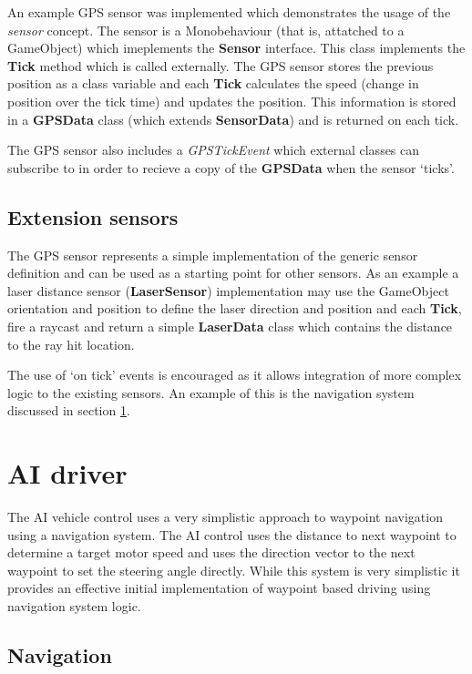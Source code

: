 \documentclass{article}
\begin{document}
An example GPS sensor was implemented which demonstrates the usage of the \textit{sensor} concept. The sensor is a Monobehaviour (that is, attatched to a GameObject) which imeplements the \textbf{Sensor} interface. This class implements the \textbf{Tick} method which is called externally. The GPS sensor stores the previous position as a class variable and each \textbf{Tick} calculates the speed (change in position over the tick time) and updates the position. This information is stored in a \textbf{GPSData} class (which extends \textbf{SensorData}) and is returned on each tick.

The GPS sensor also includes a \textit{GPSTickEvent} which external classes can subscribe to in order to recieve a copy of the \textbf{GPSData} when the sensor `ticks'.

\subsection{Extension sensors}

The GPS sensor represents a simple implementation of the generic sensor definition and can be used as a starting point for other sensors. As an example a laser distance sensor (\textbf{LaserSensor}) implementation may use the GameObject orientation and position to define the laser direction and position and each \textbf{Tick}, fire a raycast and return a simple \textbf{LaserData} class which contains the distance to the ray hit location.

The use of `on tick' events is encouraged as it allows integration of more complex logic to the existing sensors. An example of this is the navigation system discussed in section \ref{s:AI}.

\section{AI driver}\label{s:AI}

The AI vehicle control uses a very simplistic approach to waypoint navigation using a navigation system. The AI control uses the distance to next waypoint to determine a target motor speed and uses the direction vector to the next waypoint to set the steering angle directly. While this system is very simplistic it provides an effective initial implementation of waypoint based driving using navigation system logic.

\subsection{Navigation}
\end{document}
